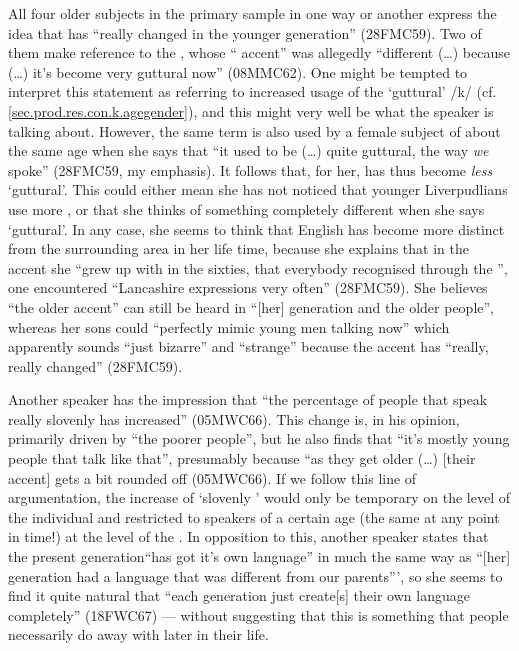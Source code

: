 All four older subjects in the primary sample in one way or another express the idea that  has ``really changed in the younger generation'' (28FMC59).
Two of them make reference to the , whose `` accent'' was allegedly ``different (\ldots) because (\ldots) it's become very guttural now'' (08MMC62).
One might be tempted to interpret this statement as referring to increased usage of the `guttural' /k/  (cf. \ref{sec.prod.res.con.k.agegender}), and this might very well be what the speaker is talking about.
However, the same term is also used by a female subject of about the same age when she says that ``it used to be (\ldots) quite guttural, the way \emph{we} spoke'' (28FMC59, my emphasis).
It follows that, for her,  has thus become \emph{less} `guttural'.
This could either mean she has not noticed that younger Liverpudlians use more , or that she thinks of something completely different when she says `guttural'.
In any case, she seems to think that  English has become more distinct from the surrounding area in her life time, because she explains that in the accent she ``grew up with in the sixties, that everybody recognised through the '', one encountered ``Lancashire expressions very often'' (28FMC59).
She believes ``the older accent'' can still be heard in ``[her] generation and the older people'', whereas her sons could ``perfectly mimic young  men talking now'' which apparently sounds ``just bizarre'' and ``strange'' because the accent has ``really, really changed'' (28FMC59).

Another speaker has the impression that ``the percentage of people that speak really slovenly  has increased'' (05MWC66).
This change is, in his opinion, primarily driven by ``the poorer people'', but he also finds that ``it's mostly young people that talk like that'', presumably because ``as they get older (\ldots) [their accent] gets a bit rounded off (05MWC66).
If we follow this line of argumentation, the increase of `slovenly ' would only be temporary on the level of the individual and restricted to speakers of a certain age (the same at any point in time!) at the level of the .
In opposition to this, another speaker states that the present generation``has got it's own language'' in much the same way as ``[her] generation had a language that was different from our parents''', so she seems to find it quite natural that ``each generation just create[s] their own language completely'' (18FWC67) --- without suggesting that this is something that people necessarily do away with later in their life.

